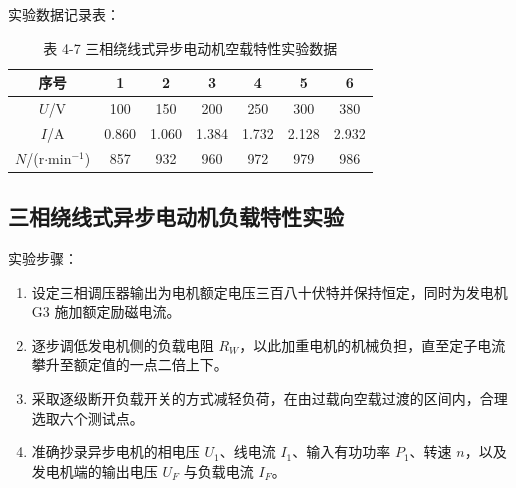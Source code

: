 \begin{framed}
{			实验数据记录表：
			\begin{table}[H]
				\centering
				\caption{\hspace{0.5em}表 4-7 三相绕线式异步电动机空载特性实验数据}
				\begin{tabular}{c|c|c|c|c|c|c}
					\hline
					序号 & 1 & 2 & 3 & 4 & 5 & 6 \\
					\hline
					$U$/V & 100 & 150 & 200 & 250 & 300 & 380 \\
					\hline
					$I$/A & 0.860 & 1.060 & 1.384 & 1.732 & 2.128 & 2.932 \\
					\hline
					$N$/(r$\cdot$min$^{-1}$) & 857 & 932 & 960 & 972 & 979 & 986 \\
					\hline
				\end{tabular}
			\end{table}
			
			\subsection{三相绕线式异步电动机负载特性实验}
			实验步骤：
			\begin{enumerate}
				\item 设定三相调压器输出为电机额定电压三百八十伏特并保持恒定，同时为发电机 G3 施加额定励磁电流。
				\item 逐步调低发电机侧的负载电阻 $R_W$，以此加重电机的机械负担，直至定子电流攀升至额定值的一点二倍上下。
				\item 采取逐级断开负载开关的方式减轻负荷，在由过载向空载过渡的区间内，合理选取六个测试点。
				\item 准确抄录异步电机的相电压 $U_1$、线电流 $I_1$、输入有功功率 $P_1$、转速 $n$，以及发电机端的输出电压 $U_F$ 与负载电流 $I_F$。
			\end{enumerate}
			
}
\end{framed}
